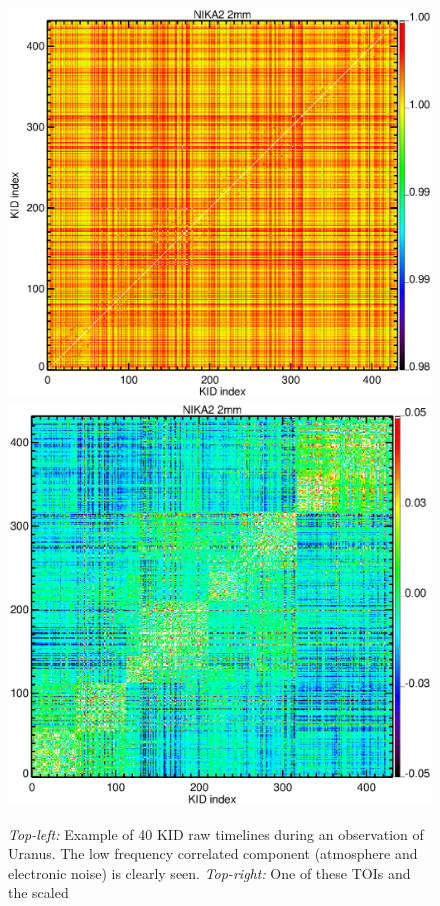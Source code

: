 \begin{figure}[hhh]
\begin{center}
\includegraphics[clip, angle=0, scale=0.4]{Figures/matrix_2mm_raw.eps}
\includegraphics[clip, angle=0, scale=0.4]{Figures/matrix_2mm_decorr.eps}
\caption{\emph{Top-left:} Example of 40 KID raw timelines during an observation
  of Uranus. The low frequency correlated component (atmosphere and electronic
  noise) is clearly seen. \emph{Top-right:} One of these TOIs and the scaled
}
\end{center}
\end{figure}
